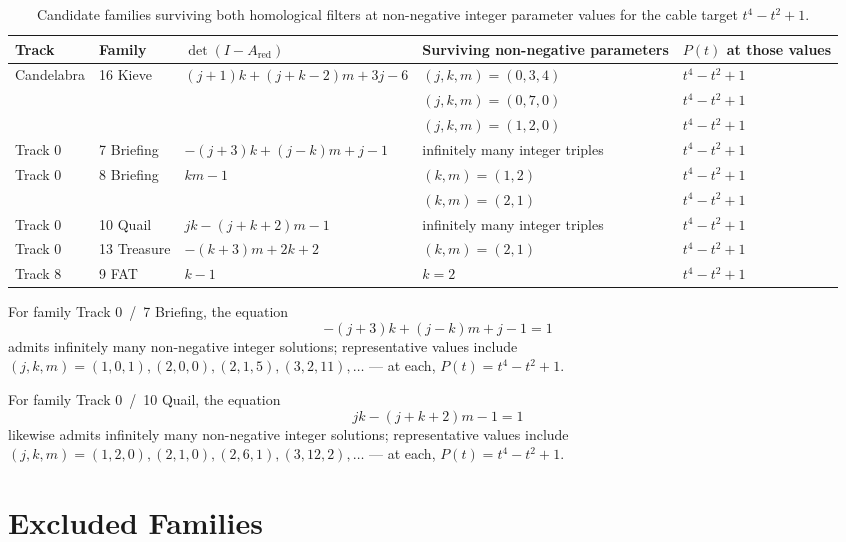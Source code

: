 \begin{table}[h]
\centering
\caption{Candidate families surviving both homological filters at non-negative integer parameter values for the cable target $t^4 - t^2 + 1$.}
\label{tab:cable_residual_families}
\begin{tabular}{@{}l l l >{\raggedright\arraybackslash}p{} l@{}}
\toprule
Track & Family & $\det(I - A_{\text{red}})$ & Surviving non-negative parameters & $P(t)$ at those values \\
\midrule
Candelabra & 16 Kieve & $(j{+}1)k+(j{+}k{-}2)m+3j-6$ & $(j,k,m) = (0,3,4)$ & $t^4 - t^2 + 1$ \\
& & & $(j,k,m) = (0,7,0)$ & $t^4 - t^2 + 1$ \\
& & & $(j,k,m) = (1,2,0)$ & $t^4 - t^2 + 1$ \\
\midrule
Track 0 & 7 Briefing & $-(j{+}3)k+(j{-}k)m+j-1$ & infinitely many integer triples & $t^4 - t^2 + 1$ \\
\midrule
Track 0 & 8 Briefing & $km - 1$ & $(k,m) = (1,2)$ & $t^4 - t^2 + 1$ \\
& & & $(k,m) = (2,1)$ & $t^4 - t^2 + 1$ \\
\midrule
Track 0 & 10 Quail & $jk-(j{+}k{+}2)m-1$ & infinitely many integer triples & $t^4 - t^2 + 1$ \\
\midrule
Track 0 & 13 Treasure & $-(k{+}3)m+2k+2$ & $(k,m) = (2,1)$ & $t^4 - t^2 + 1$ \\
\midrule
Track 8 & 9 FAT & $k - 1$ & $k = 2$ & $t^4 - t^2 + 1$ \\
\bottomrule
\end{tabular}
\end{table}

For family Track 0 \,/\, 7 Briefing, the equation
\[
-(j+3)k + (j-k)m + j - 1 = 1
\]
admits infinitely many non-negative integer solutions; representative values include $(j,k,m) = (1,0,1), (2,0,0), (2,1,5), (3,2,11), \dots$ — at each, $P(t) = t^4 - t^2 + 1$.

For family Track 0 \,/\, 10 Quail, the equation
\[
jk - (j+k+2)m - 1 = 1
\]
likewise admits infinitely many non-negative integer solutions; representative values include $(j,k,m) = (1,2,0), (2,1,0), (2,6,1), (3,12,2), \dots$ — at each, $P(t) = t^4 - t^2 + 1$.

\section{Excluded Families}

